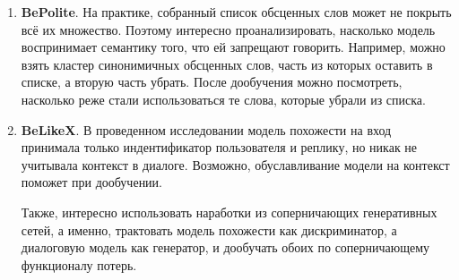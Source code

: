 \documentclass[12pt,a4paper]{amsart}
\begin{document}
\begin{enumerate}
	\item \textbf{BePolite}. На практике, собранный список обсценных слов может не покрыть всё их множество. Поэтому интересно проанализировать, насколько модель воспринимает семантику того, что ей запрещают говорить. Например,  можно взять кластер синонимичных обсценных слов, часть из которых оставить в списке, а вторую часть убрать. После дообучения можно посмотреть, насколько реже стали использоваться те слова, которые убрали из списка.
	\item \textbf{BeLikeX}. В проведенном исследовании модель похожести на вход принимала только индентификатор пользователя и реплику, но никак не учитывала контекст в диалоге. Возможно, обуславливание модели на контекст поможет при дообучении.
	
	Также, интересно использовать наработки из соперничающих генеративных сетей, а именно, трактовать модель похожести как дискриминатор, а диалоговую модель как генератор, и дообучать обоих по соперничающему функционалу потерь.
\end{enumerate}

\newpage

%

\end{document}
